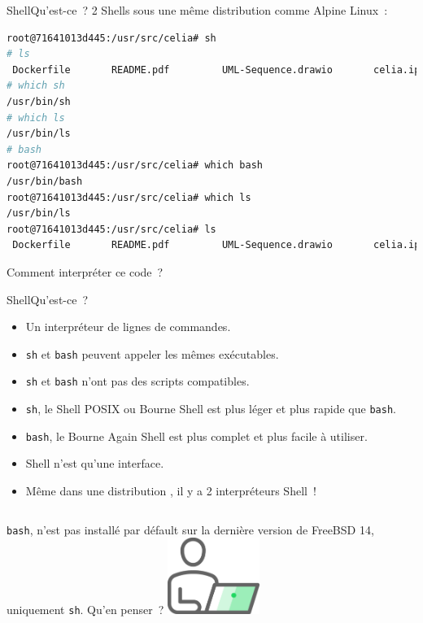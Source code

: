 \documentclass{beamer}
\begin{document}
    \begin{frame}[fragile]{Shell}{Qu'est-ce~?}
        2 Shells sous une même distribution  comme Alpine Linux~:
        \begin{lstlisting}[language=bash]
root@71641013d445:/usr/src/celia# sh
# ls
 Dockerfile       README.pdf         UML-Sequence.drawio       celia.ipynb
# which sh
/usr/bin/sh
# which ls
/usr/bin/ls
# bash
root@71641013d445:/usr/src/celia# which bash
/usr/bin/bash
root@71641013d445:/usr/src/celia# which ls
/usr/bin/ls
root@71641013d445:/usr/src/celia# ls
 Dockerfile       README.pdf         UML-Sequence.drawio       celia.ipynb
        \end{lstlisting}
        \bigbreak
        Comment interpréter ce code~?
    \end{frame}

    \begin{frame}{Shell}{Qu'est-ce~?}
        \begin{itemize}
            \item Un interpréteur de lignes de commandes.
            \item \lstinline{sh} et \lstinline{bash} peuvent appeler les mêmes exécutables.
            \item \lstinline{sh} et \lstinline{bash} n'ont pas des scripts compatibles.
            \item \lstinline{sh}, le Shell POSIX ou Bourne Shell est plus léger et plus rapide que \lstinline{bash}.
            \item \lstinline{bash}, le Bourne Again Shell est plus complet et plus facile à utiliser.
            \item Shell n'est qu'une interface.
            \item Même dans une distribution , il y a 2 interpréteurs Shell~!
        \end{itemize}
        \begin{columns}
            \lstinline{bash}, n'est pas installé par défault sur la dernière version de FreeBSD 14, uniquement \lstinline{sh}.
            Qu'en penser~?
            \centering
            \includegraphics[width=3cm]{image/guy-in-front-of-desktop}
        \end{columns}
    \end{frame}
\end{document}

